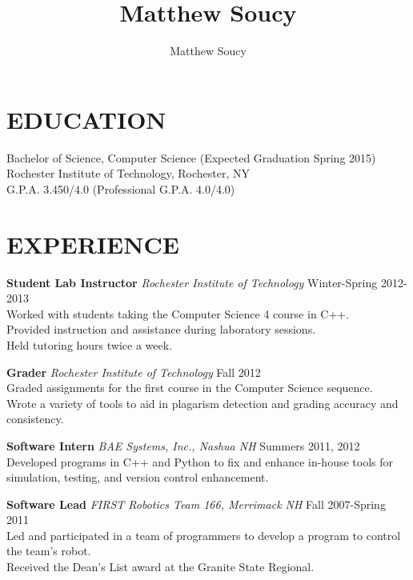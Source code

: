 \documentclass[line]{res}
\author{Matthew Soucy}
\title{Matthew Soucy}
\begin{document}
\setlength{\textheight}{11.5in} %
\address{\large 2433 Nathaniel Rochester Hall\\
		Rochester, NY 14623\\
		(603) 204-1994}
\begin{resume}

\section{EDUCATION}
    Bachelor of Science, Computer Science (Expected Graduation Spring 2015)\\
    Rochester Institute of Technology, Rochester, NY\\
    G.P.A. 3.450/4.0 (Professional G.P.A. 4.0/4.0)

\section{EXPERIENCE}
   \textbf{Student Lab Instructor}
   \textit{Rochester Institute of Technology}
   \hfill
   Winter-Spring 2012-2013\\
   Worked with students taking the Computer Science 4 course in C++.\\
   Provided instruction and assistance during laboratory sessions.\\
   Held tutoring hours twice a week.

   \textbf{Grader}
   \textit{Rochester Institute of Technology}
   \hfill
   Fall 2012\\
   Graded assignments for the first course in the Computer Science sequence.\\
   Wrote a variety of tools to aid in plagarism detection and grading accuracy and consistency.

   \textbf{Software Intern}
   \textit{BAE Systems, Inc., Nashua NH}
   \hfill
   Summers 2011, 2012\\
	Developed programs in C++ and Python to fix and enhance in-house tools for simulation, testing, and version control enhancement.

	\textbf{Software Lead}
	\textit{FIRST Robotics Team 166, Merrimack NH}
	\hfill
	Fall 2007-Spring 2011\\
	Led and participated in a team of programmers to develop a program to control the team's robot.\\
	Received the Dean's List award at the Granite State Regional.


\end{resume}
\end{document}
